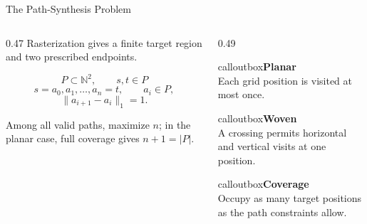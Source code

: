 \documentclass[aspectratio=169,10pt]{beamer}
\newcommand{\slideaccent}[1]{\textcolor{accent}{\sffamily\bfseries #1}}
\newcommand{\callout}[2]{%
  \begin{beamercolorbox}[wd=#1,sep=0.7em,rounded=true]{calloutbox}#2\end{beamercolorbox}%
}
\begin{document}
\begin{frame}{The Path-Synthesis Problem}
  \begin{columns}[T,totalwidth=\textwidth]
      \begin{column}{0.47\textwidth}
      \setlength{\parindent}{0pt}
      Rasterization gives a finite target region and two prescribed endpoints.\par
      \vspace{0.7em}
      \[
        P\subset\mathbb{N}^{2},
        \qquad
        s,t\in P
      \]
      \[
        s=a_0,a_1,\ldots,a_n=t,
        \qquad a_i\in P,
      \]
      \[
        \lVert a_{i+1}-a_i\rVert_1=1.
      \]
      \par
      \vspace{0.7em}
      \noindent Among all valid paths, maximize \(n\); in the planar case, full coverage gives \(n+1=|P|\).
    \end{column}
    \begin{column}{0.49\textwidth}
      \callout{\linewidth}{\slideaccent{Planar}\\Each grid position is visited at most once.}
      \vspace{0.5em}
      \callout{\linewidth}{\slideaccent{Woven}\\A crossing permits horizontal and vertical visits at one position.}
      \vspace{0.5em}
      \callout{\linewidth}{\slideaccent{Coverage}\\Occupy as many target positions as the path constraints allow.}
    \end{column}
  \end{columns}
\end{frame}
\end{document}
